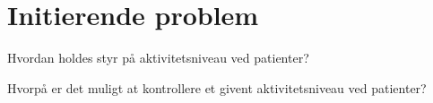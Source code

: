 





\section{Initierende problem}
Hvordan holdes styr på aktivitetsniveau ved patienter? 

Hvorpå er det muligt at kontrollere et givent aktivitetsniveau ved patienter? 
